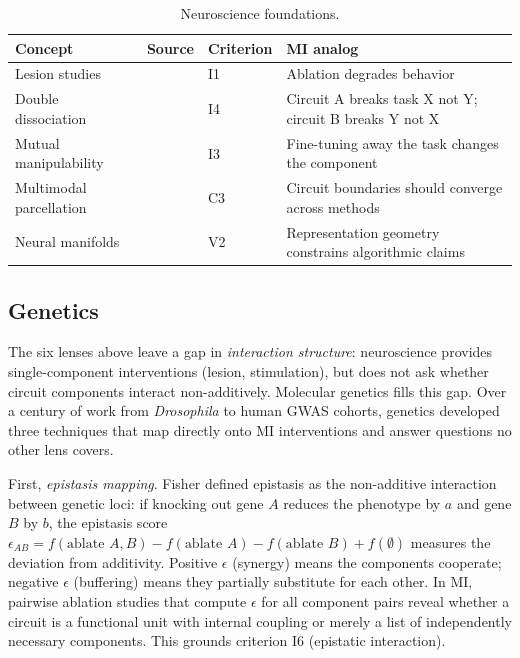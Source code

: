 \documentclass{article}
\begin{document}
\begin{table}[H]
\centering\small
\caption{Neuroscience foundations.}
\renewcommand{\arraystretch}{1.12}
\begin{tabular}{@{}l>{\raggedright\arraybackslash}p{2cm}l>{\raggedright\arraybackslash}p{4.5cm}@{}}
\toprule
\textbf{Concept} & \textbf{Source} & \textbf{Criterion} & \textbf{MI analog} \\
\midrule
Lesion studies & \citet{shallice1988neuropsychology} & I1 & Ablation degrades behavior \\
\midrule
Double dissociation & \citet{shallice1988neuropsychology} & I4 & Circuit A breaks task X not Y; circuit B breaks Y not X \\
\midrule
Mutual manipulability & \citet{craver2007explaining} & I3 & Fine-tuning away the task changes the component \\
\midrule
Multimodal parcellation & \citet{glasser2016multi} & C3 & Circuit boundaries should converge across methods \\
\midrule
Neural manifolds & \citet{gallego2017neural} & V2 & Representation geometry constrains algorithmic claims \\
\bottomrule
\end{tabular}
\end{table}


\subsection{Genetics}
\label{sec:genetics}

The six lenses above leave a gap in \emph{interaction structure}: neuroscience provides single-component interventions (lesion, stimulation), but does not ask whether circuit components interact non-additively. Molecular genetics fills this gap. Over a century of work from \emph{Drosophila} to human GWAS cohorts, genetics developed three techniques that map directly onto MI interventions and answer questions no other lens covers.

First, \emph{epistasis mapping}. Fisher defined epistasis as the non-additive interaction between genetic loci: if knocking out gene $A$ reduces the phenotype by $a$ and gene $B$ by $b$, the epistasis score $\epsilon_{AB} = f(\text{ablate } A, B) - f(\text{ablate } A) - f(\text{ablate } B) + f(\emptyset)$ measures the deviation from additivity. Positive $\epsilon$ (synergy) means the components cooperate; negative $\epsilon$ (buffering) means they partially substitute for each other. In MI, pairwise ablation studies that compute $\epsilon$ for all component pairs reveal whether a circuit is a functional unit with internal coupling or merely a list of independently necessary components. This grounds criterion I6 (epistatic interaction).
\end{document}
